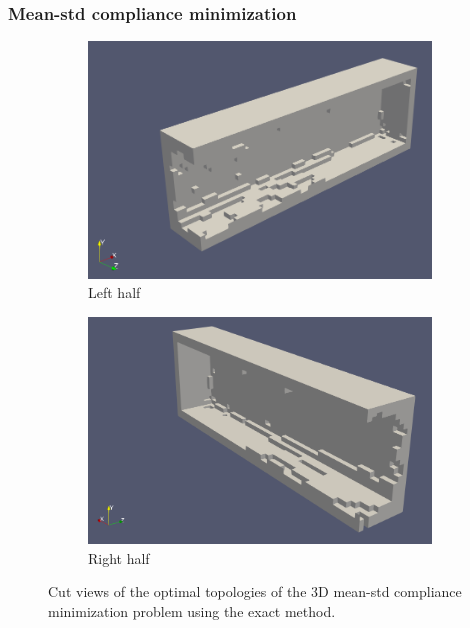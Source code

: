   \subsubsection{Mean-std compliance minimization}

    \begin{figure}
      \begin{subfigure}[t]{0.45\textwidth}
        \centering
        \includegraphics[width=1\textwidth]{./images/robust_approx/exact_mean_std_1.png}
        \caption{Left half}
      \end{subfigure} \hfill
      \begin{subfigure}[t]{0.45\textwidth}
        \centering
        \includegraphics[width=1\textwidth]{./images/robust_approx/exact_mean_std_2.png}
        \caption{Right half}
      \end{subfigure}
      \caption{Cut views of the optimal topologies of the 3D mean-std compliance minimization problem using the exact method.}
      \label{fig:exact_mean_std_3d}
    \end{figure}

